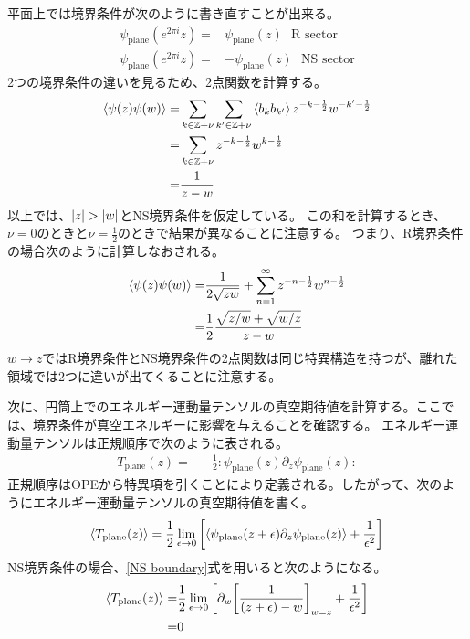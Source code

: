 \documentclass[11pt, dvipdfmx]{article}
\numberwithin{equation}{section}
\newcommand{\blankline}{\par\vspace{\baselineskip}} %
\begin{document}
平面上では境界条件が次のように書き直すことが出来る。
\begin{align}
    \psi_{\text{plane}}(e^{2\pi i} z)=&\psi_{\text{plane}}(z) \ \ \ \text{R sector}\\
    \psi_{\text{plane}}(e^{2\pi i} z)=&-\psi_{\text{plane}}(z) \ \ \ \text{NS sector}
\end{align}
2つの境界条件の違いを見るため、2点関数を計算する。
\begin{align}
    \ev{\psi(z)\psi(w)}=& \sum_{k\in \mathbb{Z}+\nu}\sum_{k'\in \mathbb{Z}+\nu} \ev{b_k b_{k'}} z^{-k-\frac{1}{2}} w^{-k'-\frac{1}{2}}\\
    =& \sum_{k\in \mathbb{Z}+\nu} z^{-k-\frac{1}{2}} w^{k-\frac{1}{2}}\\
    =&\frac{1}{z-w}\label{NS boundary}
\end{align}
以上では、$\abs{z}>\abs{w}$とNS境界条件を仮定している。
この和を計算するとき、$\nu=0$のときと$\nu=\frac{1}{2}$のときで結果が異なることに注意する。
つまり、R境界条件の場合次のように計算しなおされる。
\begin{align}
    \ev{\psi(z)\psi(w)}=& \frac{1}{2\sqrt{zw}}+\sum_{n=1}^{\infty} z^{-n-\frac{1}{2}} w^{n-\frac{1}{2}}\\
    =& \frac{1}{2}\frac{\sqrt{z/w}+\sqrt{w/z}}{z-w}\label{R 2point}
\end{align}
$w\rightarrow z$ではR境界条件とNS境界条件の2点関数は同じ特異構造を持つが、離れた領域では2つに違いが出てくることに注意する。
\blankline

次に、円筒上でのエネルギー運動量テンソルの真空期待値を計算する。ここでは、境界条件が真空エネルギーに影響を与えることを確認する。
エネルギー運動量テンソルは正規順序で次のように表される。
\begin{align}
    T_{\text{plane}}(z)=& -\frac{1}{2}:\psi_{\text{plane}}(z)\partial_z \psi_{\text{plane}}(z):
\end{align}
正規順序はOPEから特異項を引くことにより定義される。したがって、次のようにエネルギー運動量テンソルの真空期待値を書く。
\begin{align}
    \ev{T_{\text{plane}}(z)}=\frac{1}{2}\lim_{\epsilon \to 0}\qty[\ev{\psi_{\text{plane}}(z+\epsilon)\partial_z \psi_{\text{plane}}(z)} +\frac{1}{\epsilon^2}]
\end{align}
NS境界条件の場合、\eqref{NS boundary}式を用いると次のようになる。
\begin{align}
    \ev{T_{\text{plane}}(z)}=& \frac{1}{2}\lim_{\epsilon \to 0}\qty[\partial_w \qty[\frac{1}{(z+\epsilon)-w}]_{w=z}
     +\frac{1}{\epsilon^2}]\\
    =&0
\end{align}
\end{document}
